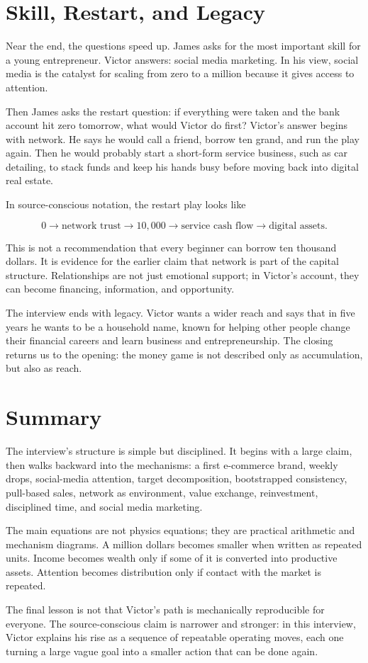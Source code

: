 \section{Skill, Restart, and Legacy}

Near the end, the questions speed up. James asks for the most important skill for a young entrepreneur. Victor answers: social media marketing. In his view, social media is the catalyst for scaling from zero to a million because it gives access to attention.

Then James asks the restart question: if everything were taken and the bank account hit zero tomorrow, what would Victor do first? Victor's answer begins with network. He says he would call a friend, borrow ten grand, and run the play again. Then he would probably start a short-form service business, such as car detailing, to stack funds and keep his hands busy before moving back into digital real estate.

In source-conscious notation, the restart play looks like

\begin{equation}
0
\longrightarrow
\text{network trust}
\longrightarrow
10{,}000
\longrightarrow
\text{service cash flow}
\longrightarrow
\text{digital assets}.
\end{equation}

This is not a recommendation that every beginner can borrow ten thousand dollars. It is evidence for the earlier claim that network is part of the capital structure. Relationships are not just emotional support; in Victor's account, they can become financing, information, and opportunity.

The interview ends with legacy. Victor wants a wider reach and says that in five years he wants to be a household name, known for helping other people change their financial careers and learn business and entrepreneurship. The closing returns us to the opening: the money game is not described only as accumulation, but also as reach.

\section{Summary}

The interview's structure is simple but disciplined. It begins with a large claim, then walks backward into the mechanisms: a first e-commerce brand, weekly drops, social-media attention, target decomposition, bootstrapped consistency, pull-based sales, network as environment, value exchange, reinvestment, disciplined time, and social media marketing.

The main equations are not physics equations; they are practical arithmetic and mechanism diagrams. A million dollars becomes smaller when written as repeated units. Income becomes wealth only if some of it is converted into productive assets. Attention becomes distribution only if contact with the market is repeated.

The final lesson is not that Victor's path is mechanically reproducible for everyone. The source-conscious claim is narrower and stronger: in this interview, Victor explains his rise as a sequence of repeatable operating moves, each one turning a large vague goal into a smaller action that can be done again.